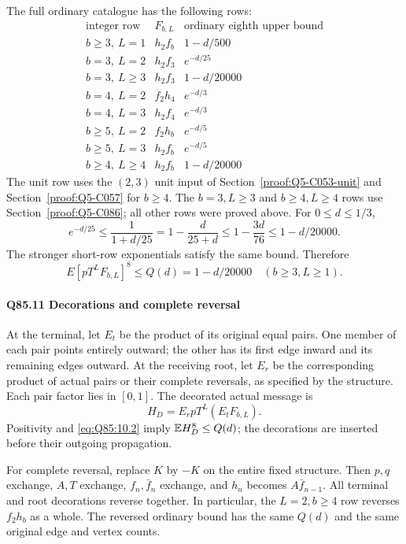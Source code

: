 The full ordinary catalogue has the following rows:
\[
\begin{array}{c|c|c}
\text{integer row}&F_{b,L}&\text{ordinary eighth upper bound}\\ \hline
b\ge3,\ L=1&h_2f_b&1-d/500\\
b=3,\ L=2&h_2f_3&e^{-d/25}\\
b=3,\ L\ge3&h_2f_3&1-d/20000\\
b=4,\ L=2&f_2h_4&e^{-d/3}\\
b=4,\ L=3&h_2f_4&e^{-d/3}\\
b\ge5,\ L=2&f_2h_b&e^{-d/5}\\
b\ge5,\ L=3&h_2f_b&e^{-d/5}\\
b\ge4,\ L\ge4&h_2f_b&1-d/20000
\end{array}
\]
The unit row uses the \((2,\allowbreak 3)\) unit input of Section~\ref{proof:Q5-C053-unit} and
Section~\ref{proof:Q5-C057} for \(b\ge\allowbreak 4\).
The \(b=\allowbreak 3,\allowbreak L\ge\allowbreak 3\) and \(b\ge\allowbreak 4,\allowbreak L\ge\allowbreak 4\) rows use Section~\ref{proof:Q5-C086};
all other rows were proved above.
For \(0\le\allowbreak  d\le\allowbreak 1/3\),
\[
 e^{-d/25}\le\frac1{1+d/25}
 =1-\frac{d}{25+d}\le1-\frac{3d}{76}
 \le1-d/20000.
\]
The stronger short-row exponentials satisfy the same bound. Therefore
\[
 \boxed{E[pT^L F_{b,L}]^8\le Q(d)=1-d/20000
   \quad(b\ge3,L\ge1).}                              \tag{Q85.10.2}\label{eq:Q85:10.2}
\]

\paragraph{Q85.11 Decorations and complete reversal}
At the terminal, let \(E_t\) be the product of its original equal pairs.
One member of each pair points entirely outward; the other has its first edge inward and its remaining edges outward.
At the receiving root, let \(E_r\) be the corresponding product of actual pairs or their complete reversals, as specified by the structure.
Each pair factor lies in \([0,\allowbreak 1]\).
The decorated actual message is
\[
 H_D=E_rpT^L(E_tF_{b,L}).                              \tag{Q85.11.1}\label{eq:Q85:11.1}
\]
Positivity and \eqref{eq:Q85:10.2} imply \(\mathbb E H_D^8\le\allowbreak  Q(d)\);
the decorations are inserted before their outgoing propagation.

For complete reversal, replace \(K\) by \(-K\) on the entire fixed structure.
Then \(p,\allowbreak q\) exchange, \(A,\allowbreak T\) exchange, \(f_n,\allowbreak \bar f_n\) exchange, and
\(h_n\) becomes \(A\bar f_{n-1}\).
All terminal and root decorations reverse together.
In particular, the \(L=\allowbreak 2,\allowbreak b\ge\allowbreak 4\) row reverses \(f_2h_b\) as a whole.
The reversed ordinary bound has the same \(Q(d)\) and the same original edge and vertex counts.
